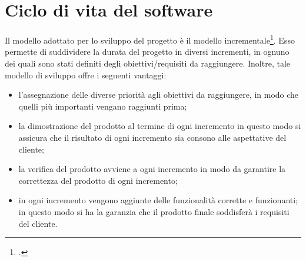 

\section{Ciclo di vita del software}\label{sec:ciclo-vita-software}
Il modello adottato per lo sviluppo del progetto è il modello incrementale\footcite{womak:ingegneria-software}.
Esso permette di suddividere la durata del progetto in diversi incrementi, in ognuno dei quali sono stati definiti degli obiettivi/requisiti da raggiungere.
Inoltre, tale modello di sviluppo offre i seguenti vantaggi:
\begin{itemize}
    \item l'assegnazione delle diverse priorità agli obiettivi da raggiungere, in modo che quelli più importanti vengano raggiunti prima;
    \item la dimostrazione del prodotto al termine di ogni incremento in questo modo si assicura che il risultato di ogni incremento sia consono alle aspettative del cliente;
    \item la verifica del prodotto avviene a ogni incremento in modo da garantire la correttezza del prodotto di ogni incremento;
    \item in ogni incremento vengono aggiunte delle funzionalità corrette e funzionanti; in questo modo si ha la garanzia che il prodotto finale soddisferà i requisiti del cliente.
\end{itemize}